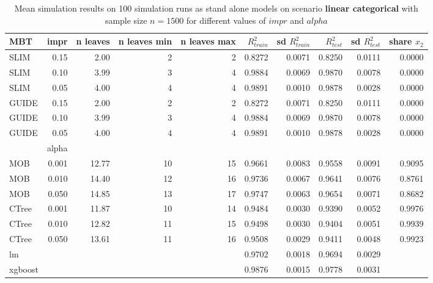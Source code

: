 \begin{table}[!htb]

\centering \tiny
\begin{tabular}[t]{l|r|r|r|r|r|r|r|r|r}
\hline
MBT & impr  & n leaves & n leaves min & n leaves max & $R^2_{train}$ & sd $R^2_{train}$ & $R^2_{test}$ & sd $R^2_{test}$ & share $x_2$\\
\hline

\hline
SLIM & 0.15 & 2.00 & 2 & 2 & 0.8272 & 0.0071 & 0.8250 & 0.0111 & 0.0000\\
SLIM & 0.10 & 3.99 & 3 & 4 & 0.9884 & 0.0069 & 0.9870 & 0.0078 & 0.0000\\
SLIM & 0.05 & 4.00 & 4 & 4 & 0.9891 & 0.0010 & 0.9878 & 0.0028 & 0.0000\\
GUIDE & 0.15 & 2.00 & 2 & 2 & 0.8272 & 0.0071 & 0.8250 & 0.0111 & 0.0000\\
GUIDE & 0.10 & 3.99 & 3 & 4 & 0.9884 & 0.0069 & 0.9870 & 0.0078 & 0.0000\\
GUIDE & 0.05 & 4.00 & 4 & 4 & 0.9891 & 0.0010 & 0.9878 & 0.0028 & 0.0000\\
\hline

  & alpha & & & & & & & & \\
\hline
MOB & 0.001 & 12.77 & 10 & 15 & 0.9661 & 0.0083 & 0.9558 & 0.0091 & 0.9095\\
MOB & 0.010 & 14.40 & 12 & 16 & 0.9736 & 0.0067 & 0.9641 & 0.0076 & 0.8761\\
MOB & 0.050 & 14.85 & 13 & 17 & 0.9747 & 0.0063 & 0.9654 & 0.0071 & 0.8682\\
CTree & 0.001 & 11.87 & 10 & 14 & 0.9484 & 0.0030 & 0.9390 & 0.0052 & 0.9976\\
CTree & 0.010 & 12.82 & 11 & 15 & 0.9498 & 0.0030 & 0.9404 & 0.0051 & 0.9939\\
CTree & 0.050 & 13.61 & 11 & 16 & 0.9508 & 0.0029 & 0.9411 & 0.0048 & 0.9923\\
\hline
lm & & & & & 0.9702 & 0.0018 & 0.9694 & 0.0029 &\\
xgboost & & & & & 0.9876 & 0.0015 & 0.9778 & 0.0031 & \\
\hline

\end{tabular}
\caption{Mean simulation results on 100 simulation runs as stand alone models on scenario \textbf{linear categorical} with sample size $n = 1500$ for different values of $impr$ and $alpha$}
\label{tab:linear_abrupt_summary} 
\end{table}




